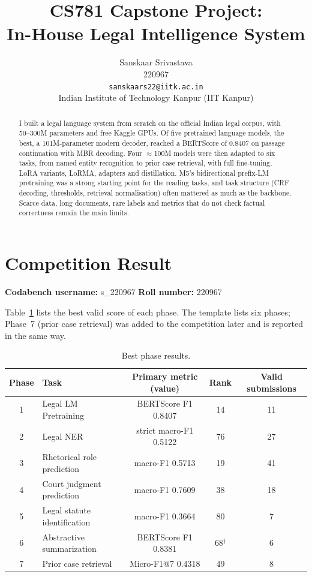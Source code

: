 \documentclass[11pt, oneside]{article}
\title{CS781 Capstone Project:\\
In-House Legal Intelligence System}
\author{
    Sanskaar Srivastava \\
    220967 \\
    {\tt sanskaars22@iitk.ac.in}\\
    Indian Institute of Technology Kanpur (IIT Kanpur)
}
\date{}
\begin{document}
\maketitle

\begin{abstract}
I built a legal language system from scratch on the official Indian legal corpus, with 50--300M parameters and free
Kaggle GPUs. Of five pretrained language models, the best, a 101M-parameter modern decoder, reached a BERTScore of
0.8407 on passage continuation with MBR decoding. Four $\approx$100M models were then adapted to six tasks, from named
entity recognition to prior case retrieval, with full fine-tuning, LoRA variants, LoRMA, adapters and distillation.
M5's bidirectional prefix-LM pretraining was a strong starting point for the reading tasks, and task structure (CRF
decoding, thresholds, retrieval normalisation) often mattered as much as the backbone. Scarce data, long documents,
rare labels and metrics that do not check factual correctness remain the main limits.
\end{abstract}

\section{Competition Result}
\noindent
\textbf{Codabench username:} s\_220967
\hfill
\textbf{Roll number:} 220967

\medskip
\noindent
Table~\ref{tab:leaderboard} lists the best valid score of each phase. The template lists six phases; Phase~7 (prior
case retrieval) was added to the competition later and is reported in the same way.

\begin{table}[H]
\centering
\caption{Best phase results.}
\label{tab:leaderboard}
\begin{tabular}{clccc}
\toprule
Phase & Task & Primary metric (value) & Rank & Valid submissions \\
\midrule
1 & Legal LM Pretraining & BERTScore F1 0.8407 & 14 & 11 \\
2 & Legal NER & strict macro-F1 0.5122 & 76 & 27 \\
3 & Rhetorical role prediction & macro-F1 0.5713 & 19 & 41 \\
4 & Court judgment prediction & macro-F1 0.7609 & 38 & 18 \\
5 & Legal statute identification & macro-F1 0.3664 & 80 & 7 \\
6 & Abstractive summarization & BERTScore F1 0.8381 & 68$^\dagger$ & 6 \\
7 & Prior case retrieval & Micro-F1@7 0.4318 & 49 & 8 \\
\bottomrule
\end{tabular}
\end{table}
\end{document}
